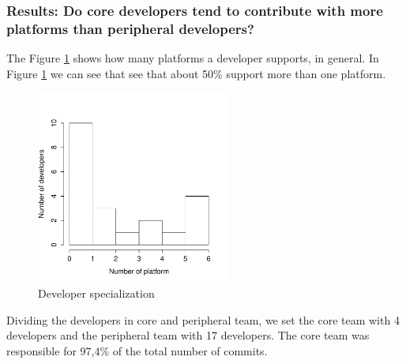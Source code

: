 \documentclass[10pt, conference]{IEEEtran}
\begin{document}


\subsubsection{Results: Do core developers tend to contribute with more platforms than peripheral developers?}

The Figure \ref{DeveloperSpecialization} shows how many platforms a developer supports, in general. In Figure \ref{DeveloperSpecialization} we can see that see that about 50\% support more than one platform. 


\begin{figure}[h]
\centering
\includegraphics[width=2.5in]{DeveloperSpecialization}
\caption{Developer specialization}
\label{DeveloperSpecialization}
\end{figure}

Dividing the developers in core and peripheral team, we set the core team with 4 developers and the peripheral team with 17 developers. The core team was responsible for 97,4\% of the total number of commits. 
\end{document}
